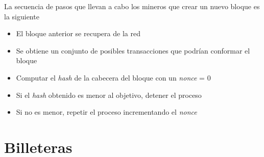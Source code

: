 La secuencia de pasos que llevan a cabo los mineros que crear un nuevo bloque es la siguiente \autocite{MasteringBlockchainMiningAlgorithm}

\begin{itemize}
    \item El bloque anterior se recupera de la red
    \item Se obtiene un conjunto de posibles transacciones que podrían conformar el bloque
    \item Computar el \emph{hash} de la cabecera del bloque con un \emph{nonce} = 0 
    \item Si el \emph{hash} obtenido es menor al objetivo, detener el proceso
    \item Si no es menor, repetir el proceso incrementando el \emph{nonce} 
\end{itemize}

\section{Billeteras}






\clearpage
\printbibliography


